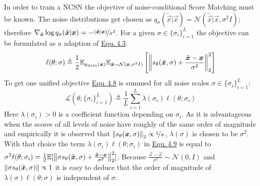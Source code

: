 In order to train a NCSN the objective of noise-conditional Score Matching must be known. The noise distributions get chosen as $q_\sigma(\tilde{\vec{x}}|\vec{x})=\mathcal{N}(\tilde{\vec{x}}|\vec{x},\sigma^2I)$; therefore $\nabla_{\tilde{\vec{x}}}\log q_\sigma(\tilde{\vec{x}}|\vec{x})=-\nicefrac{(\tilde{\vec{x}}|\vec{x})}{\sigma^2}$. For a given $\sigma\in\{\sigma_i\}_{i=1}^L$ the objective can be formulated as a adaption of \hyperref[equ:4.3]{Equ.\,4.3}:
%
\begin{equation} \label{equ:4.8}
    \ell(\theta; \sigma)\triangleq\frac{1}{2}\mathbb{E}_{p_{data}(\vec{x})}\mathbb{E}_{\tilde{\vec{x}}\sim\mathcal{N}(\vec{x},\sigma^2I)}\left[\norm{s_\theta(\tilde{\vec{x}},\sigma)+\frac{\tilde{\vec{x}}-\vec{x}}{\sigma^2}}_2^2\right]
\end{equation}
% 
To get one unified objective \hyperref[equ:4.8]{Equ.\,4.8} is summed for all noise scales $\sigma\in\{\sigma_i\}_{i=1}^L$:
%
\begin{equation} \label{equ:4.9}
    \mathcal{L}(\theta;\{\sigma_i\}_{i=1}^L)\triangleq\frac{1}{L}\sum_{i=1}^L\lambda(\sigma_i)\ell(\theta;\sigma_i)
\end{equation}
%
Here $\lambda(\sigma_i)>0$ is a coefficient function depending on $\sigma_i$. As it is advantageous when the scores of all levels of noise have roughly of the same order of magnitude and empirically it is observed that $\norm{s_\theta(\vec{x},\sigma)}_2\propto\nicefrac{1}{\sigma}$, $\lambda(\sigma)$ is chosen to be $\sigma^2$. With that choice the term $\lambda(\sigma_i)\ell(\theta;\sigma_i)$ in \hyperref[equ:4.9]{Equ.\,4.9} is equal to $\sigma^2\ell(\theta;\sigma_i)=\frac{1}{2}\mathbb{E}[\norm{\sigma s_\theta(\tilde{\vec{x}},\sigma)+\frac{\tilde{\vec{x}}-\vec{x}}{\sigma^2}}_2^2]$. Because $\frac{\tilde{\vec{x}}-\vec{x}}{\sigma^2}\sim\mathcal{N}(0, I)$ and $\norm{\sigma s_\theta(\tilde{\vec{x}},\sigma)}\propto1$ it is easy to deduce that the order of magnitude of $\lambda(\sigma)\ell(\theta;\sigma)$ is independent of $\sigma$.
%
